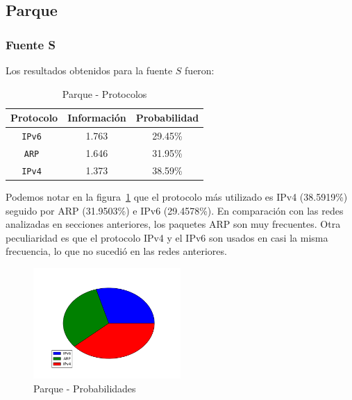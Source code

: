 \documentclass[final,inline,narroweqnarray,a4paper]{ieee}
\begin{document}
\subsection{Parque}
\subsubsection{Fuente S}

Los resultados obtenidos para la fuente $S$ fueron:

\begin{table}[H]
    \begin{center}
        \begin{tabular}{|c|c|c|}
            \hline
            \textbf{Protocolo} & \textbf{Información} & \textbf{Probabilidad} \\ \hline
            \texttt{IPv6      }& 1.763        & 29.45\%    \\ \hline
            \texttt{ARP       }& 1.646        & 31.95\%     \\ \hline
            \texttt{IPv4      }& 1.373        & 38.59\%    \\ \hline
        \end{tabular}
        \caption{Parque - Protocolos}
        \label{table:parqueS}
    \end{center}
\end{table} 

Podemos notar en la figura~\ref{torta:parqueS} que el protocolo más utilizado es IPv4 (38.5919\%) seguido por ARP (31.9503\%) e IPv6 (29.4578\%). En comparación con las redes analizadas en secciones anteriores, los paquetes ARP son muy frecuentes. Otra peculiaridad es que el protocolo IPv4 y el IPv6 son usados en casi la misma frecuencia, lo que no sucedió en las redes anteriores.

\begin{figure}[H]
    \begin{center}
        \includegraphics[width=0.5\textwidth]{plot/parqueS-pie.png}
        \caption{Parque - Probabilidades}
        \label{torta:parqueS}
    \end{center}
\end{figure}
\end{document}
